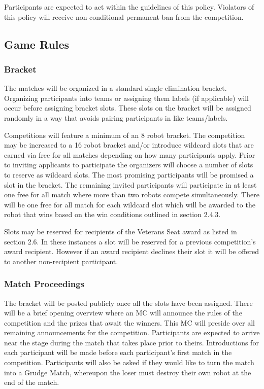 \documentclass{article}
\begin{document}
Participants are expected to act within the guidelines of this policy. Violators of this policy will receive non-conditional permanent ban from the competition.
	
	\subsection {Game Rules}	
		\subsubsection {Bracket}	
			
                        The matches will be organized in a standard single-elimination bracket. Organizing participants into teams or assigning them labels (if applicable) will occur before assigning bracket slots. These slots on the bracket will be assigned randomly in a way that avoids pairing participants in like teams/labels.
			
                        Competitions will feature a minimum of an 8 robot bracket. The competition may be increased to a 16 robot bracket and/or introduce wildcard slots that are earned via free for all matches depending on how many participants apply. Prior to inviting applicants to participate the organizers will choose a number of slots to reserve as wildcard slots. The most promising participants will be promised a slot in the bracket. The remaining invited participants will participate in at least one free for all match where more than two robots compete simultaneously. There will be one free for all match for each wildcard slot which will be awarded to the robot that wins based on the win conditions outlined in section 2.4.3.
			
                        Slots may be reserved for recipients of the Veterans Seat award as listed in section 2.6. In these instances a slot will be reserved for a previous competition's award recipient. However if an award recipient declines their slot it will be offered to another non-recipient participant.
	
		\subsubsection {Match Proceedings}	
		
                		The bracket will be posted publicly once all the slots have been assigned. There will be a brief opening overview where an MC will announce the rules of the competition and the prizes that await the winners. This MC will preside over all remaining announcements for the competition. Participants are expected to arrive near the stage during the match that takes place prior to theirs. Introductions for each participant will be made before each participant's first match in the competition. Participants will also be asked if they would like to turn the match into a Grudge Match, whereupon the loser must destroy their own robot at the end of the match.
		
\end{document}
